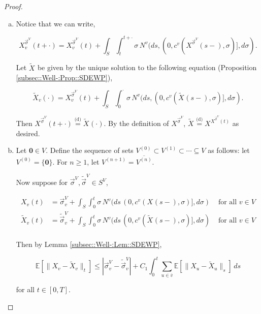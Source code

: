 \documentclass[12pt]{article}
\newcommand{\mb}{\mathbb}
\newcommand{\ov}{\overline}
\newcommand{\te}{\text}
\newcommand{\ind}{\hspace{24pt}}
\newcommand{\ex}[1]{\mb{E}\left[#1\right]}			%
\newcommand{\deq}{\overset{\text{(d)}}{=}}			%
\renewcommand{\root}{\mathbf{0}}				%
\renewcommand{\v}{v}							%
\newcommand{\vv}{u}								%
\renewcommand{\S}{S}							%
\newcommand{\s}{\sigma}							%
\newcommand{\sv}{\vec{\s}}						%
\newcommand{\T}{T}								%
\renewcommand{\t}{t}							%
\renewcommand{\tt}{s}							%
\newcommand{\X}{X}								%
\newcommand{\IGr}{c}							%
\newcommand{\vind}[1]{^{#1}}					%
\newcommand{\carp}[1]{^{#1}}					%
\newcommand{\vsi}[1]{^{#1}}						%
\newcommand{\cind}[1]{_{#1}}					%
\newcommand{\cl}{\ov}							%
\newcommand{\tp}[1]{(#1)}						%
\newcommand{\tip}[1]{#1}						%
\newcommand{\const}{C}							%
\newcommand{\sln}[1]{^{(#1)}}					%
\newcommand{\poiss}{N}							%
\newcommand{\alt}[1]{\widetilde{#1}}			%
\newcommand{\indx}[1]{_{#1}}					%
\newcommand{\pst}[1]{^{#1}}						%
\begin{document}
\begin{proof}
\begin{enumerate}[(a)]
\item Notice that we can write,

\[\X\pst{\sv\cind{}\vsi{V}}\cind{\v}\tp{\t+\cdot} = \X\pst{\sv\cind{}\vsi{V}}\cind{\v}\tp{\t} + \int_\S\int_{\t}^{\t+\cdot} \s\,\poiss\vind{\v}(d\tt,(0,\IGr\vind{\v}(\X\pst{\sv\cind{}\vsi{V}}\cind{}\tp{\tt-},\s)],d\s).\]

Let \(\alt{\X}\cind{}\tip{}\) be given by the unique solution to the following equation (Proposition \ref{subsec::Well-:Prop::SDEWP}),

\[\alt{\X}\cind{\v}\tp{\cdot} = \X\pst{\sv\cind{}\vsi{V}}\cind{\v}\tp{\t} + \int_\S \int_0^\cdot \s\,\poiss\vind{\v}(d\tt,(0,\IGr\vind{\v}(\alt{\X}\cind{}\tp{\tt-},\s)],d\s).\]

Then \(\X\pst{\sv\cind{}\vsi{V}}\cind{}\tp{\t+\cdot} \deq \alt{\X}\cind{}\tp{\cdot}\). By the definition of \(\X\pst{\sv\cind{}\vsi{V}}\cind{}\tip{}\), \(\alt{\X}\cind{}\tip{} \deq \X\pst{\X\pst{\sv\cind{}\vsi{V}}\cind{}\tp{\t}}\cind{}\tip{}\) as desired.

\item Let \(\root \in V\). Define the sequence of sets \(V\sln{0}\subset V\sln{1}\subset \cdots \subseteq V\) as follows: let \(V\sln{0} = \{\root\}\). For \(n \geq 1\), let \(V\sln{n+1} = \cl{V\sln{n}}\).

\ind Now suppose for \(\sv\cind{}\vsi{V},\alt{\sv}\cind{}\vsi{V}\in \S\carp{V}\),

\begin{align*}
\X\cind{\v}\tp{\t} &= \sv\cind{\v}\vsi{V} + \int_\S\int_0^\t \s\,\poiss\vind{\v}(d\tt\,(0,\IGr\vind{\v}(\X\cind{}\tp{\tt-},\s)],d\s)&\te{ for all } \v \in V\\
\alt{\X}\cind{\v}\tp{\t} &= \alt{\sv}\cind{\v}\vsi{V} + \int_\S\int_0^\t \s\,\poiss\vind{\v}(d\tt\,(0,\IGr\vind{\v}(\alt{\X}\cind{}\tp{\tt-},\s)],d\s)&\te{ for all } \v \in V\\
\end{align*}

Then by Lemma \ref{subsec::Well-:Lem::SDEWP},

\[\ex{\|\X\cind{\v}\tip{} - \alt{\X}\cind{\v}\tip{}\|_\t} \leq |\sv\cind{\v}\vsi{V} - \alt{\sv}\cind{\v}\vsi{V}| + \const\indx{1}\int_0^\t \sum_{\vv\in \cl{\v}} \ex{\|\X\cind{\vv}\tip{} - \alt{\X}\cind{\vv}\tip{}\|_\tt}\,d\tt\]

for all \(\t \in [0,\T]\).


\end{enumerate}
\end{proof}
\end{document}

